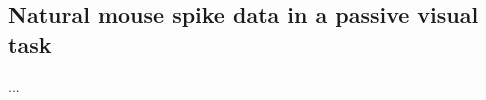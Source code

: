 \subsection{Natural mouse spike data in a passive visual task}
\label{subsection:allen_dataset}

...